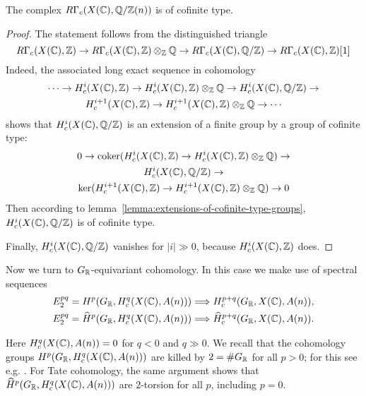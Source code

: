 \documentclass{article}
\numberwithin{equation}{section}
\begin{document}
\begin{lemma}
  The complex $R\Gamma_c (X (\mathbb{C}), \mathbb{Q}/\mathbb{Z} (n))$ is of cofinite type.

  \begin{proof}
    The statement follows from the distinguished triangle
    \[ R\Gamma_c (X (\mathbb{C}), \mathbb{Z}) \to
    R\Gamma_c (X (\mathbb{C}), \mathbb{Z})\otimes_{\mathbb{Z}} \mathbb{Q} \to
    R\Gamma_c (X (\mathbb{C}), \mathbb{Q}/\mathbb{Z}) \to
    R\Gamma_c (X (\mathbb{C}), \mathbb{Z}) [1] \]
    Indeed, the associated long exact sequence in cohomology
    \begin{multline*}
      \cdots \to H^i_c (X (\mathbb{C}), \mathbb{Z}) \to
      H^i_c (X (\mathbb{C}), \mathbb{Z})\otimes_{\mathbb{Z}} \mathbb{Q} \to
      H^i_c (X (\mathbb{C}), \mathbb{Q}/\mathbb{Z}) \to\\
      H^{i+1}_c (X (\mathbb{C}), \mathbb{Z}) \to
      H^{i+1}_c (X (\mathbb{C}), \mathbb{Z})\otimes_{\mathbb{Z}} \mathbb{Q} \to \cdots
    \end{multline*}
    shows that $H^i_c (X (\mathbb{C}), \mathbb{Q}/\mathbb{Z})$ is an extension of a finite group by a
    group of cofinite type:
    \begin{multline*}
      0 \to \operatorname{coker} (H^i_c (X (\mathbb{C}), \mathbb{Z}) \to
      H^i_c (X (\mathbb{C}), \mathbb{Z})\otimes_{\mathbb{Z}} \mathbb{Q}) \to\\
      H^i_c (X (\mathbb{C}), \mathbb{Q}/\mathbb{Z}) \to\\
      \ker (H^{i+1}_c (X (\mathbb{C}), \mathbb{Z}) \to
      H^{i+1}_c (X (\mathbb{C}), \mathbb{Z})\otimes_{\mathbb{Z}} \mathbb{Q}) \to 0
    \end{multline*}
    Then according to lemma~\ref{lemma:extensions-of-cofinite-type-groups},
    $H^i_c (X (\mathbb{C}), \mathbb{Q}/\mathbb{Z})$ is of cofinite type.

    Finally, $H^i_c (X (\mathbb{C}), \mathbb{Q}/\mathbb{Z})$ vanishes for $|i| \gg 0$, because
    $H^i_c (X (\mathbb{C}), \mathbb{Z})$ does.
  \end{proof}
\end{lemma}

Now we turn to $G_{\mathbb{R}}$-equivariant cohomology. In this case we make use of
spectral sequences
\begin{align*}
  E_2^{pq} = H^p (G_{\mathbb{R}}, H_c^q (X (\mathbb{C}), A (n))) & \Longrightarrow H_c^{p+q} (G_{\mathbb{R}}, X (\mathbb{C}), A (n)), \\
  E_2^{pq} = \widehat{H}^p (G_{\mathbb{R}}, H_c^q (X (\mathbb{C}), A (n))) & \Longrightarrow \widehat{H}_c^{p+q} (G_{\mathbb{R}}, X (\mathbb{C}), A (n)).
\end{align*}

Here $H_c^q (X (\mathbb{C}), A (n)) = 0$ for $q < 0$ and $q \gg 0$. We recall that the
cohomology groups $H^p (G_{\mathbb{R}}, H_c^q (X (\mathbb{C}), A (n)))$ are killed by
$2 = \# G_{\mathbb{R}}$ for all $p > 0$; for this see e.g.
\cite[Theorem~6.5.8]{Weibel-1994}. For Tate cohomology, the same argument shows
that $\widehat{H}^p (G_{\mathbb{R}}, H_c^q (X (\mathbb{C}), A (n)))$ are $2$-torsion for all
$p$, including $p = 0$.
\end{document}
